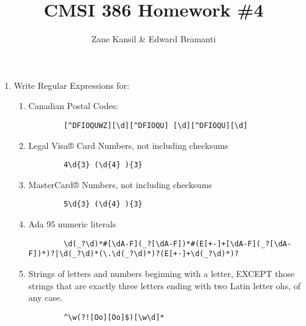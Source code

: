 \documentclass{article}
\begin{document}
\title{CMSI 386 Homework \#4}
\author{Zane Kansil \& Edward Bramanti}
\maketitle
\begin{enumerate}
    \item Write Regular Expressions for: 
    \begin{enumerate}
        \item Canadian Postal Codes:
        \begin{verbatim}
        [^DFIOQUWZ][\d][^DFIOQU] [\d][^DFIOQU][\d]
        \end{verbatim}
        \item Legal Visa® Card Numbers, not including checksums
        \begin{verbatim}
        4\d{3} (\d{4} ){3}
        \end{verbatim}
        \item MasterCard® Numbers, not including checksums
        \begin{verbatim}
        5\d{3} (\d{4} ){3}
        \end{verbatim}
        \item Ada 95 numeric literals
        \begin{verbatim}
        \d(_?\d)*#[\dA-F](_?[\dA-F])*#(E[+-]+[\dA-F](_?[\dA-F])*)?|\d(_?\d)*(\.\d(_?\d)*)?(E[+-]+\d(_?\d)*)?
        \end{verbatim}
        \item Strings of letters and numbers beginning with a letter, EXCEPT those strings that are exactly three letters ending with two Latin letter ohs, of any case.
        \begin{verbatim}
        ^\w(?![Oo][Oo]$)[\w\d]*
        \end{verbatim}
    \end{enumerate}
    \pagebreak
\end{enumerate}
\end{document}
